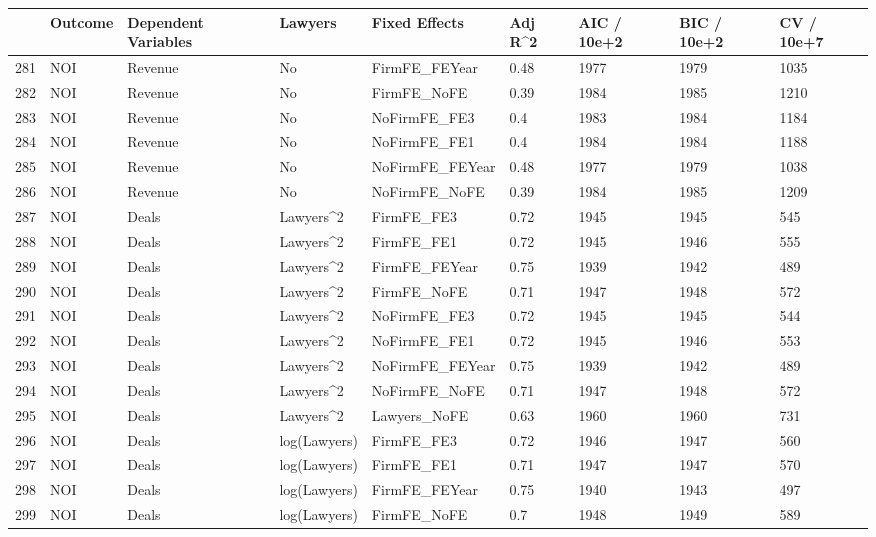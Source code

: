 \begin{table}[ht]
\centering
\begin{tabular}{rllllllll}
  \hline
 & Outcome & Dependent Variables & Lawyers & Fixed Effects & Adj R^2 & AIC / 10e+2 & BIC / 10e+2 & CV / 10e+7 \\ 
  \hline
281 & NOI & Revenue & No & FirmFE\_FEYear & 0.48 & 1977 & 1979 & 1035 \\ 
  282 & NOI & Revenue & No & FirmFE\_NoFE & 0.39 & 1984 & 1985 & 1210 \\ 
  283 & NOI & Revenue & No & NoFirmFE\_FE3 & 0.4 & 1983 & 1984 & 1184 \\ 
  284 & NOI & Revenue & No & NoFirmFE\_FE1 & 0.4 & 1984 & 1984 & 1188 \\ 
  285 & NOI & Revenue & No & NoFirmFE\_FEYear & 0.48 & 1977 & 1979 & 1038 \\ 
  286 & NOI & Revenue & No & NoFirmFE\_NoFE & 0.39 & 1984 & 1985 & 1209 \\ 
  287 & NOI & Deals & Lawyers^2 & FirmFE\_FE3 & 0.72 & 1945 & 1945 & 545 \\ 
  288 & NOI & Deals & Lawyers^2 & FirmFE\_FE1 & 0.72 & 1945 & 1946 & 555 \\ 
  289 & NOI & Deals & Lawyers^2 & FirmFE\_FEYear & 0.75 & 1939 & 1942 & 489 \\ 
  290 & NOI & Deals & Lawyers^2 & FirmFE\_NoFE & 0.71 & 1947 & 1948 & 572 \\ 
  291 & NOI & Deals & Lawyers^2 & NoFirmFE\_FE3 & 0.72 & 1945 & 1945 & 544 \\ 
  292 & NOI & Deals & Lawyers^2 & NoFirmFE\_FE1 & 0.72 & 1945 & 1946 & 553 \\ 
  293 & NOI & Deals & Lawyers^2 & NoFirmFE\_FEYear & 0.75 & 1939 & 1942 & 489 \\ 
  294 & NOI & Deals & Lawyers^2 & NoFirmFE\_NoFE & 0.71 & 1947 & 1948 & 572 \\ 
  295 & NOI & Deals & Lawyers^2 & Lawyers\_NoFE & 0.63 & 1960 & 1960 & 731 \\ 
  296 & NOI & Deals & log(Lawyers) & FirmFE\_FE3 & 0.72 & 1946 & 1947 & 560 \\ 
  297 & NOI & Deals & log(Lawyers) & FirmFE\_FE1 & 0.71 & 1947 & 1947 & 570 \\ 
  298 & NOI & Deals & log(Lawyers) & FirmFE\_FEYear & 0.75 & 1940 & 1943 & 497 \\ 
  299 & NOI & Deals & log(Lawyers) & FirmFE\_NoFE & 0.7 & 1948 & 1949 & 589 \\ 

\end{tabular}
\end{table}
